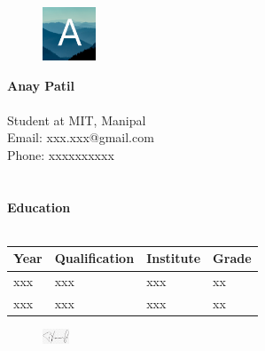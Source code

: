 \documentclass{article}
\begin{document}
\pagestyle{empty}
\begin{figure}
    \includegraphics[width=60px]{AnayLogo.png}
\end{figure}
\textbf{\huge{Anay Patil}}\\\\
Student at MIT, Manipal\\
Email: xxx.xxx@gmail.com\\
Phone: xxxxxxxxxx\\\\\\
\textbf{\Large{Education}}\\\\
\begin{tabular}{|p{0.5in}|p{1.5in}|p{2in}|p{0.5in}|}
    \hline
    Year & Qualification & Institute & Grade\\
    \hline
    xxx & xxx & xxx & xx\\
    \hline
    xxx & xxx & xxx & xx\\
    \hline
\end{tabular}
\vfill
\begin{figure}[h!]
    \flushright
    \includegraphics[width=30px]{signature.jpeg}
\end{figure}
\end{document}
